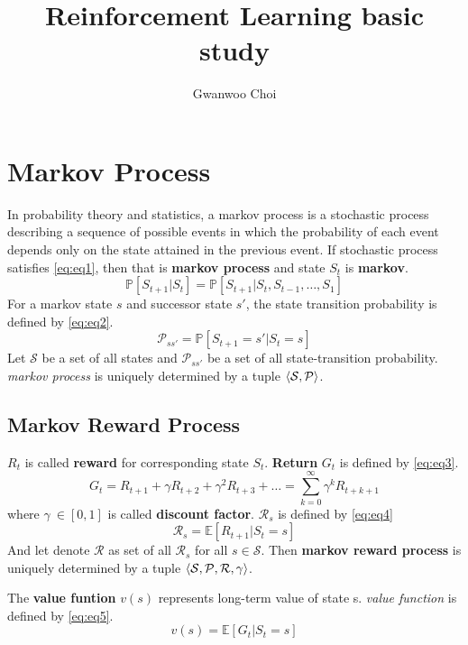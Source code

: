 \documentclass[
	10pt, %
]{article}
\title{Reinforcement Learning basic study}
\author{Gwanwoo Choi}
\theoremstyle{plain}
\newcommand{\mbb}[1]{\mathbb{#1}}
\newcommand{\mc}[1]{\mathcal{#1}}
\newcommand{\tb}[1]{\textbf{#1}}
\newcommand{\ti}[1]{\textit{#1}}
\numberwithin{equation}{subsection} %
\begin{document}
\maketitle
\newpage
\tableofcontents
\newpage
\section{Markov Process}
In probability theory and statistics, a markov process is a stochastic process describing a sequence of possible events in which the probability of each event depends only on the state attained in the previous event.
If stochastic process satisfies \cref{eq:eq1}, then that is \tb{markov process} and state $S_t$ is \tb{markov}.
\begin{equation} \label{eq:eq1}
    \mbb{P}[S_{t+1}|S_t] = \mbb{P}[S_{t+1}|S_t,S_{t-1},\dots,S_{1}]
\end{equation}
For a markov state $s$ and successor state $s'$, the state transition probability is defined by \cref{eq:eq2}.
\begin{equation} \label{eq:eq2}
    \mc{P}_{ss'} = \mbb{P}[S_{t+1} = s' | S_t = s]
\end{equation}
Let $\mc{S}$ be a set of all states and $\mc{P}_{ss'}$ be a set of all state-transition probability.
 \ti{markov process} is uniquely determined by a tuple $\braket{\mc{S}, \mc{P}}$. 


\subsection{Markov Reward Process}


$R_t$ is called \tb{reward} for corresponding state $S_t$. \tb{Return} $G_t$ is defined by \cref{eq:eq3}.   
\begin{equation} \label{eq:eq3}
    G_t = R_{t+1} + \gamma R_{t+2} + \gamma^2 R_{t+3} + \dots = \sum^{\infty}_{k=0}\gamma^k R_{t+k+1}
\end{equation}
where $\gamma \ \in [0,1] $ is called \tb{discount factor}.
$\mc{R}_s$ is defined by \cref{eq:eq4}
\begin{equation} \label{eq:eq4}
    \mc{R}_s = \mbb{E}[R_{t+1}|S_t=s]
\end{equation}
And let denote $\mc{R}$ as set of all $\mc{R}_s$ for all $s \in \mc{S}$. Then \tb{markov reward process} is uniquely determined by a tuple $\braket{\mc{S}, \mc{P}, \mc{R}, \gamma}$.

The \tb{value funtion} $v(s)$ represents long-term value of state s. \ti{value function} is defined by \cref{eq:eq5}.
\begin{equation} \label{eq:eq5}
    v(s) = \mbb{E}[G_t|S_t=s]
\end{equation}
\end{document}
